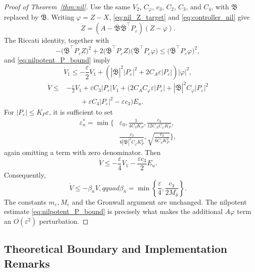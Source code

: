 \documentclass[journal]{IEEEtran}
\newcommand{\eps}{\varepsilon}
\newcommand{\Bcal}{\mathfrak B}
\newcommand{\Bbar}{\bar{\mathfrak B}}
\newcommand{\abs}[1]{\left|#1\right|}
\begin{document}
\begin{proof}[Proof of Theorem~\ref{thm:nil}]
Use the same \(V_2\), \(C_\varphi\), \(c_3\), \(C_2\), \(C_3\), and \(C_4\), with \(\Bcal\) replaced by \(\Bbar\). Writing \(\varphi=Z-X\), \eqref{eq:nil_Z_target} and \eqref{eq:controller_nil} give
\begin{equation}
 \dot Z=(A-\Bbar\Bbar^\top P_\eps)(Z-\varphi). \label{eq:nil_Z_closed}
\end{equation}
The Riccati identity, together with
\begin{equation*}
 -\bigl(\Bbar^\top P_\eps Z\bigr)^2
 +2\bigl(\Bbar^\top P_\eps Z\bigr)
      \bigl(\Bbar^\top P_\eps\varphi\bigr)
 \leq \bigl(\Bbar^\top P_\eps\varphi\bigr)^2,
\end{equation*}
and \eqref{eq:nilpotent_P_bound} imply
\begin{equation}
 \dot V_1\leq-\frac\eps2V_1
 +\left(\abs{\Bbar}^{2}\abs{P_\eps}^2
 +2C_A\eps\abs{P_\eps}\right)\abs{\varphi}^2,
 \label{eq:nil_V1_est}
\end{equation}
\begin{align}
 \dot V\leq{}&-\frac\eps2V_1+\eps C_3\abs{P_\eps}V_1
 +\Big(2C_AC_\varphi\eps\abs{P_\eps}
 +\abs{\Bbar}^{2}C_\varphi\abs{P_\eps}^2\nonumber\\
 &\qquad +\eps C_4\abs{P_\eps}^2
 -\eps c_3\Big)E_u. \label{eq:nil_V_combine}
\end{align}
For \(\abs{P_\eps}\leq K_P\eps\), it is sufficient to set
\begin{align}
 \eps_n^*=\min\Bigg\{&\eps_0,\frac{1}{4C_3K_P},
 \frac{c_3}{12C_AC_\varphi K_P}, \nonumber\\
 &\frac{c_3}{6\abs{\Bbar}^{2}C_\varphi K_P^2},
 \sqrt{\frac{c_3}{6C_4K_P^2}}\Bigg\}, \label{eq:eps_star_nil}
\end{align}
again omitting a term with zero denominator. Then
\begin{equation}
 \dot V\leq-\frac{\eps}{4}V_1-\frac{\eps c_3}{2}E_u.
\end{equation}
Consequently,
\begin{equation}
 \dot V\leq-\beta_nV,qquad
 \beta_n=\min\left\{\frac{\eps}{4},\frac{c_3}{2M_\delta}\right\}.
\end{equation}
The constants \(m_\eps,M_\eps\) and the Gronwall argument are unchanged.
The nilpotent estimate \eqref{eq:nilpotent_P_bound} is precisely what makes
the additional \(A\varphi\) term an \(O(\eps^2)\) perturbation.
\end{proof}

\subsection{Theoretical Boundary and Implementation Remarks}
\end{document}
